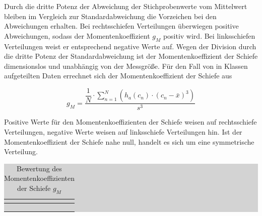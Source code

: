 \noindent Durch die dritte Potenz der Abweichung der Stichprobenwerte vom Mittelwert bleiben im Vergleich zur Standardabweichung die Vorzeichen bei den Abweichungen erhalten. Bei rechtsschiefen Verteilungen \"{u}berwiegen positive Abweichungen, sodass der Momentenkoeffizient $g_{M}$ positiv wird. Bei linksschiefen Verteilungen weist er entsprechend negative Werte auf. Wegen der Division durch die dritte Potenz der Standardabweichung ist der Momentenkoeffizient der Schiefe dimensionslos und unabh\"{a}ngig von der Messgr\"{o}{\ss}e. F\"{u}r den Fall von in Klassen aufgeteilten Daten errechnet sich der Momentenkoeffizient der Schiefe aus

\begin{equation}\label{eq:threefifty}
g_{M} =\dfrac{\dfrac{1}{N} \cdot \sum _{n=1}^{N}\left(h_{a} (c_{n} )\cdot (c_{n} -\bar{x})^{3} \right) }{s^{3} }
\end{equation} 

\noindent Positive Werte f\"{u}r den Momentenkoeffizienten der Schiefe weisen auf rechtsschiefe Verteilungen, negative Werte weisen auf linksschiefe Verteilungen hin. Ist der Momentenkoeffizient der Schiefe nahe null, handelt es sich um eine symmetrische Verteilung.

\begin{table}[H]
\setlength{\arrayrulewidth}{.1em}
\caption{Bewertung des Momentenkoeffizienten der Schiefe $g_{M}$}
\setlength{\fboxsep}{0pt}%
\colorbox{lightgray}{%
%
\begin{tabular}{| c | c |}
\hline
\parbox[c][0.3in][c]{3.3in}{\smallskip\centering\textbf{\selectfont{Kennwert}}} & 
\parbox[c][0.3in][c]{3.3in}{\smallskip\centering\textbf{\selectfont{Symmetrieeigenschaft}}}\\ \hline

\parbox[c][0.3in][c]{3.3in}{\centering{}} & 
\parbox[c][0.3in][c]{3.3in}{\centering{}\selectfont{tRechtsschiefe Verteilung}}\\ \hline

\parbox[c][0.3in][c]{3.3in}{\centering{}} & 
\parbox[c][0.3in][c]{3.3in}{\centering{}\selectfont{Symmetrische Verteilung}}\\ \hline

\parbox[c][0.3in][c]{3.3in}{\centering{}} & 
\parbox[c][0.3in][c]{3.3in}{\centering{}\selectfont{Linksschiefe Verteilung}}\\ \hline

\end{tabular}%
}
\label{tab:threefifteen}
\end{table}


